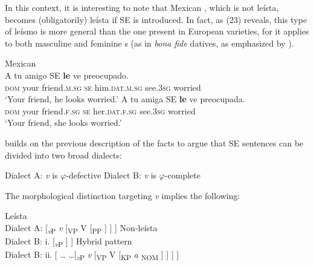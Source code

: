 \documentclass[output=paper]{langsci/langscibook}
\begin{document}
          

In this context, it is interesting to note that Mexican , which is not leísta, becomes (obligatorily) leísta if SE is introduced. In fact, as (23) reveals, this type of leísmo is more general than the one present in European varieties, for it applies to both masculine and feminine {\CATDP}s (as in \textit{bona fide} datives, as emphasized by \citealt{Colomina2017}).

\ea%
    Mexican \label{ex:gallego:23}\\
    \ea
    \gll A       tu      amigo         SE  \textbf{le} ve         preocupado.  \\
         \textsc{dom}   your friend\textsc{{}.m.}\textsc{sg} \textsc{se}   him\textsc{{}.dat.m.}\textsc{sg}  see\textsc{.3sg} worried\\
    \glt ‘Your friend, he looks worried.’
    \ex
    \gll A       tu      amiga        SE  \textbf{le} ve          preocupada. \\
         \textsc{dom}   your friend\textsc{{}.f.}\textsc{sg} \textsc{se}   her\textsc{{}.dat.f.}\textsc{sg} see\textsc{.3sg} worried\\
    \glt ‘Your friend, she looks worried.’
    \z
\z

\citet{Gallego2016} builds on the previous description of the facts to argue that  SE sentences can be divided into two broad dialects:

\ea%
    \label{ex:gallego:24}
    \ea Dialect A: \textit{v} is $\varphi ${}-defective
    \ex Dialect B: \textit{v} is $\varphi ${}-complete
    \z
\z

The morphological distinction targeting \textit{v} implies the following:

\ea%
    \label{ex:gallego:25}
    \ea Leísta \\
     Dialect A:   [\textit{\textsubscript{v}}\textsubscript{P} \textit{v} [\textsubscript{VP} V  [\textsubscript{PP}  ] ] ] 
    \ex Non-leísta \\
    Dialect B:  i.  [\textit{\textsubscript{v}}\textsubscript{P} \relax [\textsubscript{VP} V [\textsubscript{KP} \textit{a} \ConnectHead{DP}\textsubscript{ACC} ] ] ]
    \ex Hybrid pattern\\
    Dialect B:  ii.   [ \ldots\xspace {} \ldots\xspace [\textit{\textsubscript{v}}\textsubscript{P} \textit{v} [\textsubscript{VP} V [\textsubscript{KP} \textit{a} \textsubscript{NOM} ] ] ] ]
    \z
\z\largerpage
\end{document}
